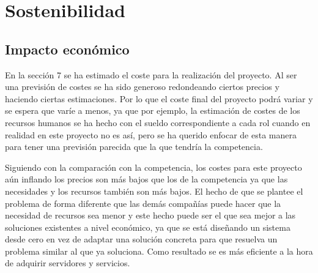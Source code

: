 \chapter{Sostenibilidad}
\section{Impacto económico}
En la sección 7 se ha estimado el coste para la realización del proyecto. Al ser una previsión de costes se ha sido generoso redondeando ciertos precios y haciendo ciertas estimaciones. Por lo que el coste final del proyecto podrá variar y se espera que varíe a menos, ya que por ejemplo, la estimación de costes de los recursos humanos se ha hecho con el sueldo correspondiente a cada rol cuando en realidad en este proyecto no es así, pero se ha querido enfocar de esta manera para tener una previsión parecida que la que tendría la competencia. 

Siguiendo con la comparación con la competencia, los costes para este proyecto aún inflando los precios son más bajos que los de la competencia ya que las necesidades y los recursos también son más bajos. El hecho de que se plantee el problema de forma diferente que las demás compañías puede hacer que la necesidad de recursos sea menor y este hecho puede ser el que sea mejor a las soluciones existentes a nivel económico, ya que se está diseñando un sistema desde cero en vez de adaptar una solución concreta para que resuelva un problema similar al que ya soluciona. Como resultado se es más eficiente a la hora de adquirir servidores y servicios.


